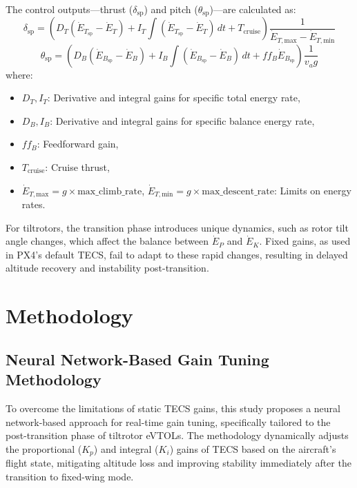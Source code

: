 \documentclass[journal,article,submit,pdftex,moreauthors]{Definitions/mdpi}
\begin{document}
The control outputs—thrust (\(\delta_{\text{sp}}\)) and pitch (\(\theta_{\text{sp}}\))—are calculated as:
\begin{equation}
    \delta_{\text{sp}} = \left( D_T (\dot{E}_{T_{\text{sp}}} - \dot{E}_T) + I_T \int (\dot{E}_{T_{\text{sp}}} - \dot{E}_T) \, dt + T_{\text{cruise}} \right) \frac{1}{\dot{E}_{T,\text{max}} - \dot{E}_{T,\text{min}}}
\end{equation}
\begin{equation}
    \theta_{\text{sp}} = \left( D_B (\dot{E}_{B_{\text{sp}}} - \dot{E}_B) + I_B \int (\dot{E}_{B_{\text{sp}}} - \dot{E}_B) \, dt + ff_B \dot{E}_{B_{\text{sp}}} \right) \frac{1}{v_a g}
\end{equation}
where:
\begin{itemize}
    \item \(D_T, I_T\): Derivative and integral gains for specific total energy rate,
    \item \(D_B, I_B\): Derivative and integral gains for specific balance energy rate,
    \item \(ff_B\): Feedforward gain,
    \item \(T_{\text{cruise}}\): Cruise thrust,
    \item \(\dot{E}_{T,\text{max}} = g \times \text{max\_climb\_rate}\), \(\dot{E}_{T,\text{min}} = g \times \text{max\_descent\_rate}\): Limits on energy rates.
\end{itemize}

For tiltrotors, the transition phase introduces unique dynamics, such as rotor tilt angle changes, which affect the balance between \(\dot{E}_P\) and \(\dot{E}_K\). Fixed gains, as used in PX4’s default TECS, fail to adapt to these rapid changes, resulting in delayed altitude recovery and instability post-transition.

\section{Methodology}
\subsection{Neural Network-Based Gain Tuning Methodology}
To overcome the limitations of static TECS gains, this study proposes a neural network-based approach for real-time gain tuning, specifically tailored to the post-transition phase of tiltrotor eVTOLs. The methodology dynamically adjusts the proportional (\(K_p\)) and integral (\(K_i\)) gains of TECS based on the aircraft’s flight state, mitigating altitude loss and improving stability immediately after the transition to fixed-wing mode.
\end{document}
